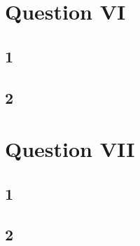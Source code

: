\documentclass{article}
\begin{document}
\section*{Question VI}

\subsection{1}

\subsection{2}

\section*{Question VII}

\subsection{1}

\subsection{2}
\end{document}
